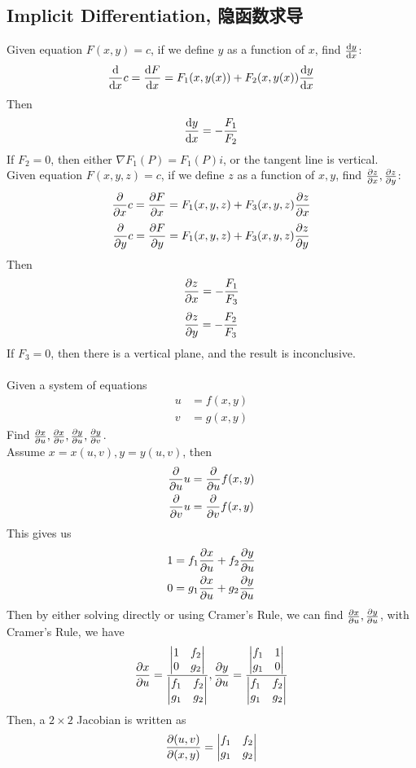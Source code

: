 \subsection{Implicit Differentiation, 隐函数求导}
Given equation $F(x, y) = c$, if we define $y$ as a function of $x$, find $\dv{y}{x}$:
$$\dv{x} c = \dv{F}{x} = F_1(x, y(x)) + F_2(x, y(x))\dv{y}{x}$$
Then 
$$\dv{y}{x} = -\frac{F_1}{F_2}$$
If $F_2 = 0$, then either $\nabla F_1(P) = F_1(P)i$, or the tangent line is vertical. \\
Given equation $F(x, y, z) = c$, if we define $z$ as a function of $x, y$, find $\pdv{z}{x}, \pdv{z}{y}$:
$$\pdv{x} c = \pdv{F}{x} = F_1(x, y, z) + F_3(x, y, z)\pdv{z}{x}$$
$$\pdv{y} c = \pdv{F}{y} = F_1(x, y, z) + F_3(x, y, z)\pdv{z}{y}$$
Then 
$$\pdv{z}{x} = -\frac{F_1}{F_3}$$
$$\pdv{z}{y} = -\frac{F_2}{F_3}$$
If $F_3 = 0$, then there is a vertical plane, and the result is inconclusive. \\
\\
Given a system of equations
\begin{align*}
    u &= f(x, y) \\
    v &= g(x, y)
\end{align*}
Find $\pdv{x}{u}, \pdv{x}{v}, \pdv{y}{u}, \pdv{y}{v}$. \\
Assume $x = x(u, v), y = y(u, v)$, then
\begin{align*}
    \pderivative{u} u &= \pderivative{u} f(x, y) \\
    \pderivative{v} u &= \pderivative{v} f(x, y)
\end{align*}
This gives us
\begin{align*}
    1 &= f_1 \pdv{x}{u} + f_2 \pdv{y}{u} \\
    0 &= g_1 \pdv{x}{u} + g_2 \pdv{y}{u}
\end{align*}
Then by either solving directly or using Cramer's Rule, we can find $\pdv{x}{u}, \pdv{y}{u}$, with Cramer's Rule, we have
$$\pdv{x}{u} = \frac{\begin{vmatrix}
    1 & f_2 \\
    0 & g_2
\end{vmatrix}}{\begin{vmatrix}
    f_1 & f_2 \\
    g_1 & g_2
\end{vmatrix}}, \pdv{y}{u} = \frac{\begin{vmatrix}
    f_1 & 1 \\
    g_1 & 0
\end{vmatrix}}{\begin{vmatrix}
    f_1 & f_2 \\
    g_1 & g_2
\end{vmatrix}}$$
Then, a $2 \times 2$ Jacobian is written as
$$\pdv{(u, v)}{(x, y)} = \begin{vmatrix}
    f_1 & f_2 \\
    g_1 & g_2
\end{vmatrix}$$

